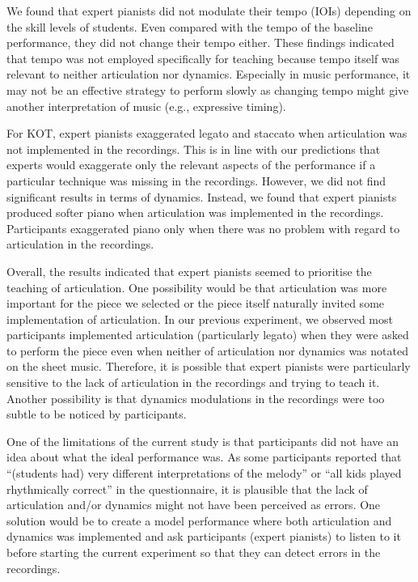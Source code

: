 \documentclass[
  man]{apa6}
\begin{document}
We found that expert pianists did not modulate their tempo (IOIs) depending on the skill levels of students. Even compared with the tempo of the baseline performance, they did not change their tempo either. These findings indicated that tempo was not employed specifically for teaching because tempo itself was relevant to neither articulation nor dynamics. Especially in music performance, it may not be an effective strategy to perform slowly as changing tempo might give another interpretation of music (e.g., expressive timing).

For KOT, expert pianists exaggerated legato and staccato when articulation was not implemented in the recordings. This is in line with our predictions that experts would exaggerate only the relevant aspects of the performance if a particular technique was missing in the recordings. However, we did not find significant results in terms of dynamics. Instead, we found that expert pianists produced softer piano when articulation was implemented in the recordings. Participants exaggerated piano only when there was no problem with regard to articulation in the recordings.

Overall, the results indicated that expert pianists seemed to prioritise the teaching of articulation. One possibility would be that articulation was more important for the piece we selected or the piece itself naturally invited some implementation of articulation. In our previous experiment, we observed most participants implemented articulation (particularly legato) when they were asked to perform the piece even when neither of articulation nor dynamics was notated on the sheet music. Therefore, it is possible that expert pianists were particularly sensitive to the lack of articulation in the recordings and trying to teach it. Another possibility is that dynamics modulations in the recordings were too subtle to be noticed by participants.

One of the limitations of the current study is that participants did not have an idea about what the ideal performance was. As some participants reported that ``(students had) very different interpretations of the melody'' or ``all kids played rhythmically correct'' in the questionnaire, it is plausible that the lack of articulation and/or dynamics might not have been perceived as errors. One solution would be to create a model performance where both articulation and dynamics was implemented and ask participants (expert pianists) to listen to it before starting the current experiment so that they can detect errors in the recordings.
\end{document}
